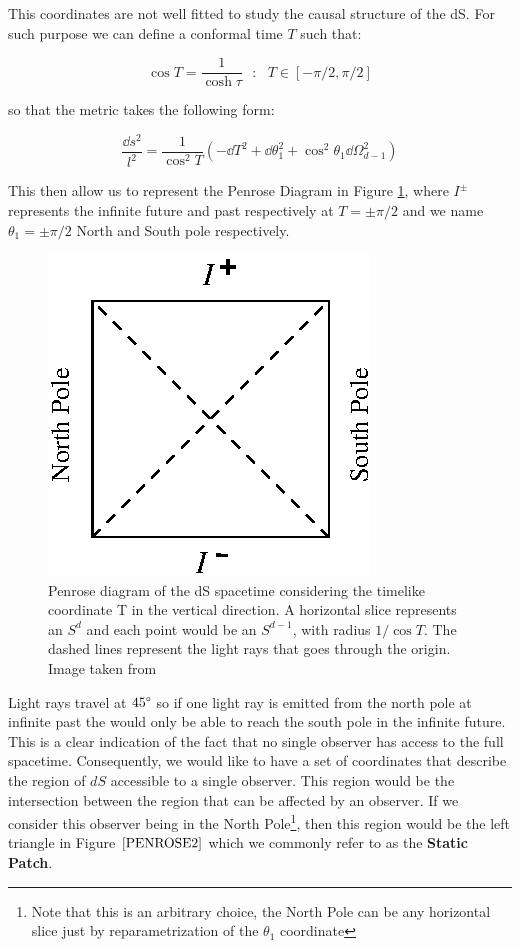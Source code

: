 \documentclass[11pt,a4paper]{article}
\begin{document}
This coordinates are not well fitted to study the causal structure of the dS. For such purpose we can define a conformal time $T$ such that:

\begin{equation}
    \cos T = \frac{1}{\cosh\tau} ~~~:~~~ T\in[-\pi/2,\pi/2]
\end{equation}

{\noindent so that the metric takes the following form:}

\begin{equation}
    \frac{\dd s^2}{l^2} = \frac{1}{\cos^2 T}\left(-\dd T^2 + \dd\theta_1^2 +\cos^2\theta_1\dd\Omega_{d-1}^2\right)
\end{equation}

This then allow us to represent the Penrose Diagram in Figure \ref{PENROSE}, where $I^\pm$ represents the infinite future and past respectively at $T=\pm\pi/2$ and we name $\theta_1=\pm \pi/2$ North and South pole respectively. 

\begin{figure}[ht]
    \centering
    \includegraphics[width=0.5\linewidth]{figs/PENROSE.eps}
    \caption{Penrose diagram of the dS spacetime considering the timelike coordinate T in the vertical direction. A horizontal slice represents an $S^d$ and each point would be an $S^{d-1}$, with radius $1/\cos T$. The dashed lines represent the light rays that goes through the origin. Image taken from \cite{spradlin2001leshoucheslecturessitter}}
    \label{PENROSE}
\end{figure}

Light rays travel at $45\degree$ so if one light ray is emitted from the north pole at infinite past the would only be able to reach the south pole in the infinite future. This is a clear indication of the fact that no single observer has access to the full spacetime. Consequently, we would like to have a set of coordinates that describe the region of $dS$ accessible to a single observer. This region would be the intersection between the region that can be affected by an observer. If we consider this observer being in the North Pole\footnote{Note that this is an arbitrary choice, the North Pole can be any horizontal slice just by reparametrization of the $\theta_1$ coordinate}, then this region would be the left triangle in Figure $\ref{PENROSE2}$ which we commonly refer to as the \textbf{Static Patch}.
\end{document}
